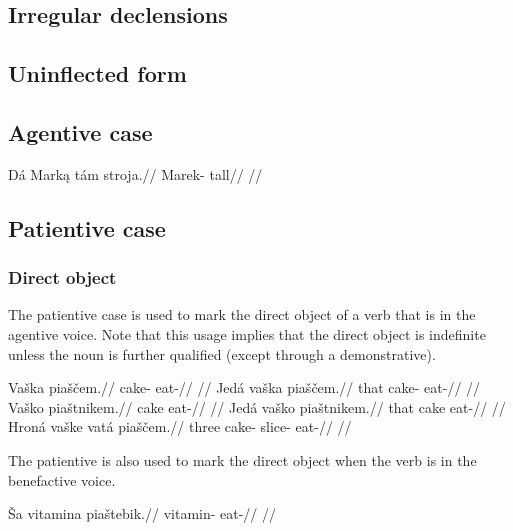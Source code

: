 \subsection{Irregular declensions}

\subsection{Uninflected form}


\subsection{Agentive case}

\pex
\begingl
\gla Dá Mark\k{a} tám stroja.//
\glb {} Marek-\Agt{}  tall//
\glft {}//
\endgl
\xe


\subsection{Patientive case}

\subsubsection{Direct object}
The patientive case is used to mark the direct object of a verb that is in the agentive voice. Note that this usage implies that the direct object is indefinite unless the noun is further qualified (except through a demonstrative).

\pex
\a
\begingl
\gla Vaška piaščem.//
\glb cake-\Pat{} eat-//
\glft {}//
\endgl
\a
\begingl
\gla Jedá vaška piaščem.//
\glb that cake-\Pat{} eat-//
\glft {}//
\endgl
\a
\begingl
\gla Vaško piaštnikem.//
\glb cake eat-//
\glft {}//
\endgl
\a
\begingl
\gla Jedá vaško piaštnikem.//
\glb that cake eat-//
\glft {}//
\endgl
\a
\begingl
\gla Hroná vaške vatá piaščem.//
\glb three cake-\Gen{} slice-\Pat{} eat-//
\glft {}//
\endgl
\xe

The patientive is also used to mark the direct object when the verb is in the benefactive voice.

\pex
\begingl
\gla Ša vitamina piaštebik.//
\glb {} vitamin-\Pat{} eat-//
\glft {}//
\endgl
\xe

